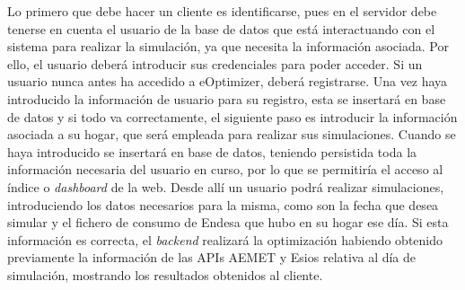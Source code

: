 Lo primero que debe hacer un cliente es identificarse, pues en el servidor debe tenerse en cuenta el usuario de la base de datos que está interactuando con el sistema para realizar la simulación, ya que necesita la información asociada. Por ello, el usuario deberá introducir sus credenciales para poder acceder. Si un usuario nunca antes ha accedido a eOptimizer, deberá registrarse. Una vez haya introducido la información de usuario para su registro, esta se insertará en base de datos y si todo va correctamente, el siguiente paso es introducir la información asociada a su hogar, que será empleada para realizar sus simulaciones. Cuando se haya introducido se insertará en base de datos, teniendo persistida toda la información necesaria del usuario en curso, por lo que se permitiría el acceso al índice o \textit{dashboard} de la web. Desde allí un usuario podrá realizar simulaciones, introduciendo los datos necesarios para la misma, como son la fecha que desea simular y el fichero de consumo de Endesa que hubo en su hogar ese día. Si esta información es correcta, el \textit{backend} realizará la optimización habiendo obtenido previamente la información de las APIs AEMET y Esios relativa al día de simulación, mostrando los resultados obtenidos al cliente.\\

